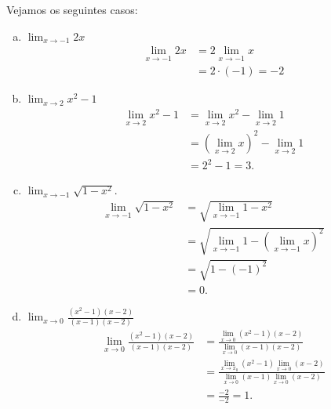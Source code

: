 \begin{ex}
  Vejamos os seguintes casos:
  \begin{enumerate}[a)]
  \item $\displaystyle \lim_{x\to -1} 2x$
  \begin{align}
    \lim_{x\to -1} 2x &= 2\lim_{x\to -1} x\\
    &= 2\cdot(-1) = -2
  \end{align}
\item $\displaystyle \lim_{x\to 2} x^2 - 1$
  \begin{align}
    \lim_{x\to 2} x^2 - 1 &= \lim_{x\to 2} x^2 - \lim_{x\to 2} 1\\
                          &= \left(\lim_{x\to 2} x\right)^2 - \lim_{x\to 2} 1\\
    &= 2^2 - 1 = 3.
  \end{align}
\item $\displaystyle \lim_{x\to -1} \sqrt{1-x^2}$.
  \begin{align}
    \lim_{x\to -1} \sqrt{1-x^2} &= \sqrt{\lim_{x\to -1} 1-x^2}\\
                                &= \sqrt{\lim_{x\to -1} 1 - \left(\lim_{x\to -1} x\right)^2}\\
                                &= \sqrt{1 - (-1)^2} \\
                                &= 0.
  \end{align}
\item $\displaystyle \lim_{x\to 0} \frac{(x^2-1)(x-2)}{(x-1)(x-2)}$
  \begin{align}
    \lim_{x\to 0} \frac{(x^2-1)(x-2)}{(x-1)(x-2)} &= \frac{\lim_{x\to 0}(x^2-1)(x-2)}{\lim_{x\to 0} (x-1)(x-2)}\\
                                                  &= \frac{\lim_{x\to x_0} (x^2-1)\lim_{x\to 0}(x-2)}{\lim_{x\to 0}(x-1)\lim_{x\to 0}(x-2)}\\
    &= \frac{-2}{-2} = 1.
  \end{align}
  \end{enumerate}
\end{ex}



